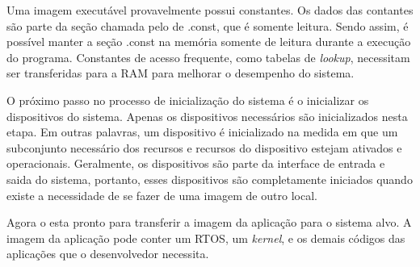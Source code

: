 Uma imagem executável provavelmente possui constantes. Os dados das contantes são parte da seção chamada pelo \linker de .const, que é somente leitura. Sendo assim, é possível manter a seção .const na memória somente de leitura durante a execução do programa. Constantes de acesso frequente, como tabelas de \textit{lookup}, necessitam ser transferidas para a RAM para melhorar o desempenho do sistema.

O próximo passo no processo de inicialização do sistema é o \loader inicializar os dispositivos do sistema. Apenas os dispositivos necessários são inicializados nesta etapa. Em outras palavras, um dispositivo é inicializado na medida em que um subconjunto necessário dos recursos e recursos do dispositivo estejam ativados e operacionais. Geralmente, os dispositivos são parte da interface de entrada e saida do sistema, portanto, esses dispositivos são completamente iniciados quando existe a necessidade de se fazer \download de uma imagem de outro local.

Agora o \loader esta pronto para transferir a imagem da aplicação para o sistema alvo. A imagem da aplicação pode conter um RTOS, um \textit{kernel}, e os demais códigos das aplicações que o desenvolvedor necessita.





